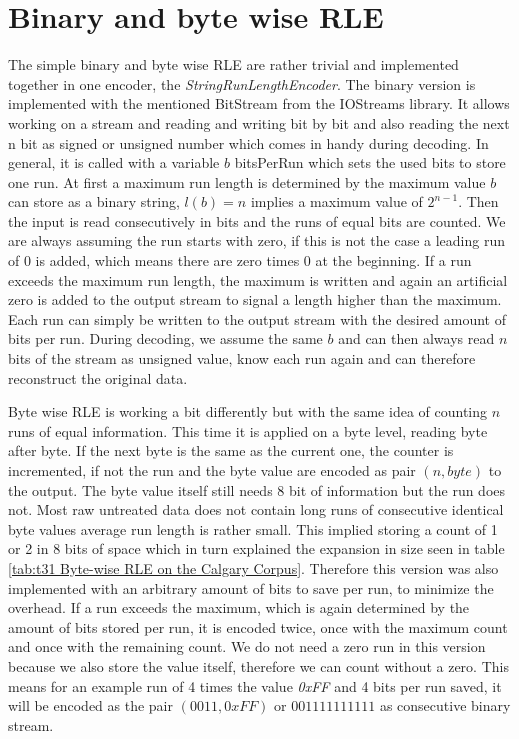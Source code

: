 \section{Binary and byte wise RLE}
\label{ch:Implementation:bin and byte rle}
\par{
	The simple binary and byte wise RLE are rather trivial and implemented together in one encoder, the \textit{StringRunLengthEncoder}. The binary version is implemented with the mentioned BitStream from the IOStreams library. It allows working on a stream and reading and writing bit by bit and also reading the next n bit as signed or unsigned number which comes in handy during decoding. In general, it is called with a variable $b$ bitsPerRun which sets the used bits to store one run. At first a maximum run length is determined by the maximum value $b$ can store as a binary string, $l(b) = n$ implies a maximum value of $2^{n-1}$. Then the input is read consecutively in bits and the runs of equal bits are counted. We are always assuming the run starts with zero, if this is not the case a leading run of 0 is added, which means there are zero times 0 at the beginning. If a run exceeds the maximum run length, the maximum is written and again an artificial zero is added to the output stream to signal a length higher than the maximum. Each run can simply be written to the output stream with the desired amount of bits per run. During decoding, we assume the same $b$ and can then always read $n$ bits of the stream as unsigned value, know each run again and can therefore reconstruct the original data.
}
\par{
	Byte wise RLE is working a bit differently but with the same idea of counting $n$ runs of equal information. This time it is applied on a byte level, reading byte after byte. If the next byte is the same as the current one, the counter is incremented, if not the run and the byte value are encoded as pair $(n, byte)$ to the output. The byte value itself still needs 8 bit of information but the run does not. Most raw untreated data does not contain long runs of consecutive identical byte values average run length is rather small. This implied storing a count of 1 or 2 in 8 bits of space which in turn explained the expansion in size seen in table \ref{tab:t31 Byte-wise RLE on the Calgary Corpus}. Therefore this version was also implemented with an arbitrary amount of bits to save per run, to minimize the overhead. If a run exceeds the maximum, which is again determined by the amount of bits stored per run, it is encoded twice, once with the maximum count and once with the remaining count. We do not need a zero run in this version because we also store the value itself, therefore we can count without a zero. This means for an example run of 4 times the value \textit{0xFF} and 4 bits per run saved, it will be encoded as the pair $(0011,0xFF)$ or $001111111111$ as consecutive binary stream.
}
